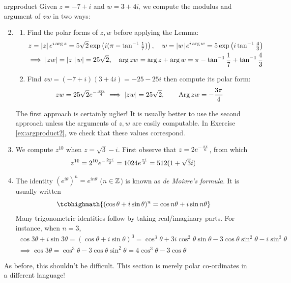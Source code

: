 \begin{examples}{}{argproduct}
	\exstart Given $z=-7+i$ and $w=3+4i$, we compute the modulus and argument of $zw$ in two ways:
	\begin{enumerate}\setcounter{enumi}{1}
	  \item[]\begin{enumerate}
	    \item\label{ex:argproduct1a} Find the polar forms of $z,w$ before applying the Lemma:
	  	\begin{gather*}
		  	z=\left| z\right|e^{i\arg z} = 5\sqrt{2}\exp\left(i(\pi-\tan^{-1}\tfrac 17)\right),\quad w=\left| w\right|e^{i\arg w}=5\exp\left(i\tan^{-1}\tfrac 43\right)\\
		  	\implies\left| zw\right|=\left| z\right|\left| w\right| = 25\sqrt{2},\quad \arg zw= \arg z+\arg w = \pi-\tan^{-1}\frac 17+\tan^{-1}\frac 43
	  	\end{gather*}
	  	\item Find $zw=(-7+i)(3+4i)=-25-25i$ then compute its polar form:
	  	\[
	  		zw=25\sqrt 2e^{-\frac{3\pi i}{4}}\implies \left| zw\right|=25\sqrt 2,\qquad \operatorname{Arg} zw=-\frac{3\pi}4
	  	\]
			\end{enumerate}
			The first approach is certainly uglier! It is usually better to use the second approach unless the arguments of $z,w$ are easily computable. In Exercise \ref{ex:argproduct2}, we check that these values correspond.
		
		\item We compute $z^{10}$ when $z=\sqrt 3-i$. First observe that $z=2e^{-\frac{\pi i}{6}}$, from which
		\[
			z^{10}=2^{10}e^{-\frac{5\pi i}{3}} =1024e^{\frac{\pi i}{3}} =512(1+\sqrt 3i)
		\]
	
		\item The identity $(e^{i\theta})^n=e^{in\theta}$ ($n\in\mathbb{Z}$) is known as \emph{de Moivre's formula}. It is usually written
		\[
			\tcbhighmath{(\cos\theta+i\sin\theta)^n=\cos n\theta+i\sin n\theta}
		\]
		Many trigonometric identities follow by taking real/imaginary parts. For instance, when $n=3$,
		\begin{gather*}
			\cos 3\theta+i\sin 3\theta =(\cos\theta+i\sin\theta)^3 =\cos^3\!\theta+3i\cos^2\!\theta\sin\theta-3\cos\theta\sin^2\!\theta -i\sin^3\!\theta\\
			\implies \cos 3\theta=\cos^3\!\theta-3\cos\theta\sin^2\!\theta=4\cos^3\!\theta-3\cos\theta
		\end{gather*}
	\end{enumerate}
\end{examples}

As before, this shouldn't be difficult. This section is merely polar co-ordinates in a different language!


